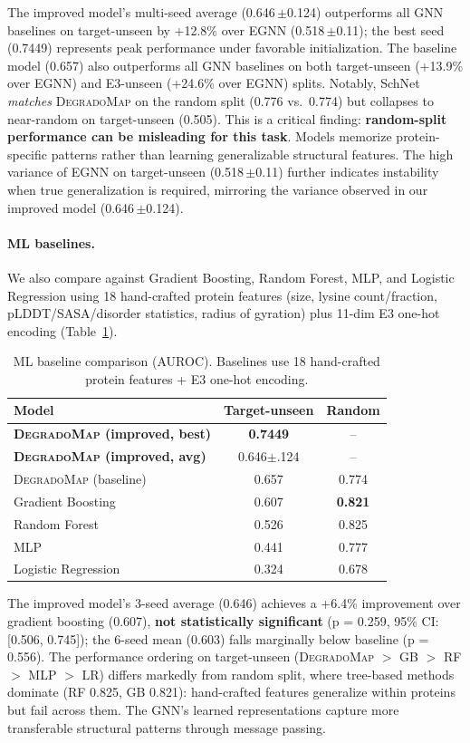 \documentclass[sigconf]{acmart}
\newcommand{\ours}{\textsc{DegradoMap}}
\newcommand{\spm}[1]{{\scriptsize$\pm$#1}}
\begin{document}
The improved model's multi-seed average (0.646\,\spm{0.124}) outperforms all GNN baselines on target-unseen by +12.8\% over EGNN (0.518\,\spm{0.11}); the best seed (0.7449) represents peak performance under favorable initialization.
The baseline model (0.657) also outperforms all GNN baselines on both target-unseen (+13.9\% over EGNN) and E3-unseen (+24.6\% over EGNN) splits.
Notably, SchNet \emph{matches} \ours{} on the random split (0.776 vs.\ 0.774) but collapses to near-random on target-unseen (0.505).
This is a critical finding: \textbf{random-split performance can be misleading for this task}.
Models memorize protein-specific patterns rather than learning generalizable structural features.
The high variance of EGNN on target-unseen (0.518\,\spm{0.11}) further indicates instability when true generalization is required, mirroring the variance observed in our improved model (0.646\,\spm{0.124}).

\paragraph{ML baselines.}
We also compare against Gradient Boosting, Random Forest, MLP, and Logistic Regression using 18 hand-crafted protein features (size, lysine count/fraction, pLDDT/SASA/disorder statistics, radius of gyration) plus 11-dim E3 one-hot encoding (Table~\ref{tab:ml_baselines}).

\begin{table}[!ht]
\centering
\caption{ML baseline comparison (AUROC). Baselines use 18 hand-crafted protein features + E3 one-hot encoding.}
\label{tab:ml_baselines}
\small
\begin{tabular}{@{}lcc@{}}
\toprule
\textbf{Model} & \textbf{Target-unseen} & \textbf{Random} \\
\midrule
\textbf{\ours{} (improved, best)} & \textbf{0.7449} & -- \\
\textbf{\ours{} (improved, avg)} & 0.646\spm{.124} & -- \\
\ours{} (baseline) & 0.657 & 0.774 \\
Gradient Boosting & 0.607 & \textbf{0.821} \\
Random Forest & 0.526 & 0.825 \\
MLP & 0.441 & 0.777 \\
Logistic Regression & 0.324 & 0.678 \\
\bottomrule
\end{tabular}
\end{table}

The improved model's 3-seed average (0.646) achieves a +6.4\% improvement over gradient boosting (0.607), \textbf{not statistically significant} (p = 0.259, 95\% CI: [0.506, 0.745]); the 6-seed mean (0.603) falls marginally below baseline (p = 0.556).
The performance ordering on target-unseen (\ours{} $>$ GB $>$ RF $>$ MLP $>$ LR) differs markedly from random split, where tree-based methods dominate (RF 0.825, GB 0.821): hand-crafted features generalize within proteins but fail across them.
The GNN's learned representations capture more transferable structural patterns through message passing.
\end{document}
